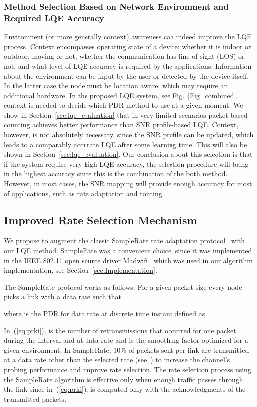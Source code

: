 \documentclass[11pt,draftclsnofoot,journal,onecolumn]{IEEEtran}
\begin{document}
\subsubsection{Method Selection Based on Network Environment and Required LQE Accuracy}
\label{sec:context}

Environment (or more generally context) awareness can indeed improve the LQE process. Context encompasses operating state of a device: whether it is indoor or outdoor, moving or not, whether the communication has line of sight (LOS) or not, and what level of LQE accuracy is required by the applications. Information about the environment can be input by the user or detected by the device itself. In the latter case the node must be location aware, which may require an additional hardware. In the proposed LQE system, see Fig.~\ref{Fig_combined}, context is needed to decide which PDR method to use at a given moment. We show in Section~\ref{sec:lqe_evaluation} that in very limited scenarios packet based counting achieves better performance than SNR profile-based LQE. Context, however, is not absolutely necessary, since the SNR profile can be updated, which leads to a comparably accurate LQE after some learning time. This will also be shown in Section~\ref{sec:lqe_evaluation}. Our conclusion about this selection is that if the system require very high LQE accuracy, the selection procedure will bring in the highest accuracy since this is the combination of the both method. However, in most cases, the SNR mapping will provide enough accuracy for most of applications, such as rate adaptation and routing.

\subsection{Improved Rate Selection Mechanism}
\label{sec:SNR_RATE}

We propose to augment the classic SampleRate rate adaptation protocol~\cite{Bicket_SampleRate_2005} with our LQE method. SampleRate was a convenient choice, since it was implemented in the IEEE 802.11 open source driver Madwifi~\cite{MadWifi} which was used in our algorithm implementation, see Section~\ref{sec:Implementation}.

The SampleRate protocol works as follows. For a given packet size every node picks a link with a data rate such that

where  is the PDR for data rate  at discrete time instant  defined as

In~(\ref{eq:prki}),  is the number of retransmissions that occurred for one packet during the  interval and at data rate  and  is the smoothing factor optimized for a given environment. In SampleRate, 10\% of packets sent per link are transmitted at a data rate other than the selected rate (see~\cite[Ch. 5]{Bicket_SampleRate_2005}) to increase the channel's probing performance and improve rate selection. The rate selection process using the SampleRate algorithm is effective only when enough traffic passes through the link since in~(\ref{eq:prki}),  is computed only with the acknowledgments of the transmitted packets.
\end{document}
